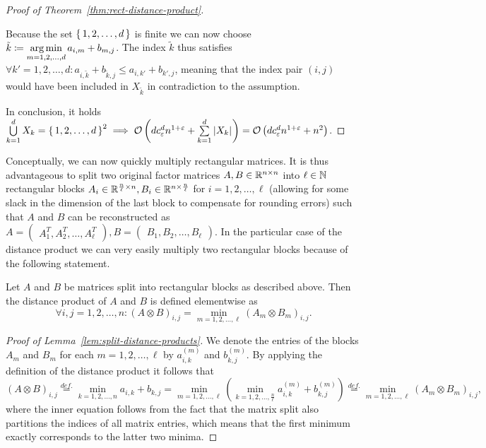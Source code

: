 \begin{proof}[Proof of Theorem~\ref{thm:rect-distance-product}]
\begin{enumerate}
            Because the set $\left\{\,1, 2, \dots, d\,\right\}$ is finite we can now choose $\tilde{k} \coloneqq \operatorname*{arg\,min}\limits_{m = 1, 2, \dots, d} a_{i, m} + b_{m, j}$.
            The index $\tilde{k}$ thus satisfies $\forall k' = 1, 2, \dots, d: a_{i, \tilde{k}} + b_{\tilde{k}, j} \leq a_{i, k'} + b_{k', j}$, meaning that the index pair $(i, j)$ would have been included in $X_{\tilde{k}}$ in contradiction to the assumption. \Lightning{}
    \end{enumerate}
    In conclusion, it holds $\bigcup\limits_{k = 1}^d X_k = \left\{\,1, 2, \dots, d\,\right\}^2 \implies \mathcal{O}\left( d c_\varepsilon^d n^{1 + \varepsilon} + \sum\limits_{k = 1}^d \left\lvert X_k\right\rvert_{} \right) = \mathcal{O}\left( d c_\varepsilon^d n^{1 + \varepsilon} + n^2 \right)$.
\end{proof}

Conceptually, we can now quickly multiply rectangular matrices.
It is thus advantageous to split two original factor matrices $A, B \in \mathbb{R}^{n \times n}$ into $\ell \in \mathbb{N}$ rectangular blocks $A_i \in \mathbb{R}^{\frac{n}{\ell} \times n}, B_i \in \mathbb{R}^{n \times \frac{n}{\ell}}$ for $i = 1, 2, \dots, \ell$ (allowing for some slack in the dimension of the last block to compensate for rounding errors) such that $A$ and $B$ can be reconstructed as $A = \begin{pmatrix}
        A_1^T, A_2^T, \dots, A_{\ell}^T
    \end{pmatrix},
    B = \begin{pmatrix}
        B_1, B_2, \dots, B_{\ell}
    \end{pmatrix}$.
In the particular case of the distance product we can very easily multiply two rectangular blocks because of the following statement.

\begin{lemma}\label{lem:split-distance-products}
    Let $A$ and $B$ be matrices split into rectangular blocks as described above.
    Then the distance product of $A$ and $B$ is defined elementwise as
    \[
        \forall i, j = 1, 2, \dots, n: {(A \otimes B)}_{i, j} = \min\limits_{m = 1, 2, \dots, \ell} {(A_m \otimes B_m)}_{i, j}.
    \]
\end{lemma}

\begin{proof}[Proof of Lemma~\ref{lem:split-distance-products}]
    We denote the entries of the blocks $A_m$ and $B_m$ for each $m = 1, 2, \dots, \ell$ by $a_{i, k}^{(m)}$ and $b_{k, j}^{(m)}$.
    By applying the definition of the distance product it follows that
    \[
        {(A \otimes B)}_{i, j} \overset{def.}{=} \min\limits_{k = 1, 2, \dots, n} a_{i, k} + b_{k, j} = \min\limits_{m = 1, 2, \dots, \ell} \left( \min\limits_{k = 1, 2, \dots, \frac{n}{\ell}} a_{i, k}^{(m)} + b_{k, j}^{(m)} \right) \overset{def.}{=} \min\limits_{m = 1, 2, \dots, \ell} {(A_m \otimes B_m)}_{i, j},
    \]
    where the inner equation follows from the fact that the matrix split also partitions the indices of all matrix entries, which means that the first minimum exactly corresponds to the latter two minima.
\end{proof}

